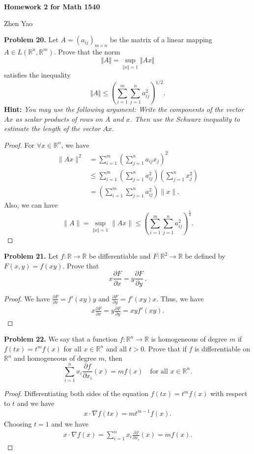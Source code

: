 \documentclass[12pt,leqno]{amsart}
\theoremstyle{definition}
\begin{document}
\centerline{\bf Homework 2 for Math 1540}
\centerline{Zhen Yao}

\bigskip





\noindent
{\bf Problem 20.}
Let $A=\left(a_{ij}\right)_{m\times n}$ be the matrix of a linear mapping
$A\in L(\mathbb{R}^n,\mathbb{R}^m)$. Prove that the norm
$$
\Vert A\Vert=\sup_{\Vert x\Vert=1}\Vert Ax\Vert
$$
satisfies the inequality
$$
\Vert A\Vert \leq\left(\sum_{i=1}^m\sum_{j=1}^na_{ij}^2\right)^{1/2}.
$$
{\bf Hint:} {\em You may use the following argument: Write the components of
the vector $Ax$ as scalar products of rows on $A$ and $x$.
Then use the Schwarz inequality to estimate the length of the vector $Ax$.}
\begin{proof}
For $\forall x\in\mathbb{R}^n$, we have
\begin{align*}
    \|Ax\|^2 & = \sum^m_{i=1} \left(\sum^n_{j=1} a_{ij} x_j\right)^2 \\
    & \leq \sum^m_{i=1} \left(\sum^n_{j=1} a_{ij}^2 \right) \left(\sum^n_{j=1} x_{j}^2 \right) \\
    & = \left(\sum_{i=1}^m\sum_{j=1}^na_{ij}^2\right) \|x\|.
\end{align*}
Also, we can have
$$\|A\| = \sup_{\Vert x\Vert=1} \|Ax\| \leq \left(\sum_{i=1}^m\sum_{j=1}^na_{ij}^2\right)^{\frac{1}{2}}.$$
\end{proof}

\medskip

\noindent
{\bf Problem 21.}
Let $f:\mathbb{R}\to\mathbb{R}$ be differentiable and $F:\mathbb{R}^2\to\mathbb{R}$ be defined by
$F(x,y)=f(xy)$. Prove that
$$
x\frac{\partial F}{\partial x}=y\frac{\partial F}{\partial y}\, .
$$
\begin{proof}
We have $\frac{\partial F}{\partial x} = f'(xy)y$ and $\frac{\partial F}{\partial y} = f'(xy)x$. Thus, we have 
\begin{align*}
    x\frac{\partial F}{\partial x} = y\frac{\partial F}{\partial y} = xy f'(xy).
\end{align*}
\end{proof}

\medskip

\noindent
{\bf Problem 22.}
We say that a function $f:\mathbb{R}^n\to\mathbb{R}$ is homogeneous of degree $m$ if
$f(tx)=t^mf(x)$ for all $x\in\mathbb{R}^n$ and all $t>0$.
Prove that if $f$ is differentiable on $\mathbb{R}^n$ and homogeneous of
degree $m$, then
$$
\sum_{i=1}^n x_i\frac{\partial f}{\partial x_i}(x) = mf(x)
\quad
\mbox{for all $x\in\mathbb{R}^n$.}
$$
\begin{proof}
Differentiating both sides of the equation $f(tx)=t^mf(x)$ with respect to $t$ and we have
\begin{align*}
    x \cdot \nabla f(tx) = m t^{m-1} f(x).
\end{align*}
Choosing $t = 1$ and we have 
\begin{align*}
    x \cdot \nabla f(x) = \sum^n_{i=1} x_i \frac{\partial f}{\partial x_i}(x) = m f(x).
\end{align*}
\end{proof}
\end{document}
